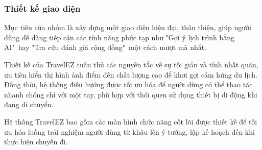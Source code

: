 \subsubsection{Thiết kế giao diện}
Mục tiêu của nhóm là xây dựng một giao diện hiện đại, thân thiện, giúp người dùng dễ dàng tiếp cận các tính năng phức tạp như "Gợi ý lịch trình bằng AI"\ hay "Tra cứu đánh giá cộng đồng"\ một cách mượt mà nhất.

Thiết kế của TravelEZ tuân thủ các nguyên tắc về sự tối giản và tính nhất quán, ưu tiên hiển thị hình ảnh điểm đến chất lượng cao để khơi gợi cảm hứng du lịch. Đồng thời, hệ thống điều hướng được tối ưu hóa để người dùng có thể thao tác nhanh chóng chỉ với một tay, phù hợp với thói quen sử dụng thiết bị di động khi đang di chuyển.

Hệ thống TravelEZ bao gồm các màn hình chức năng cốt lõi được thiết kế để tối ưu hóa luồng trải nghiệm người dùng từ khâu lên ý tưởng, lập kế hoạch đến khi thực hiện chuyến đi.
